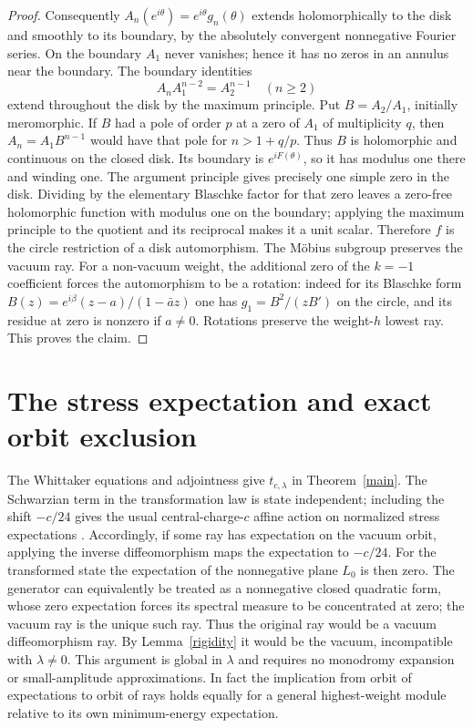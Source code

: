 \documentclass[11pt]{article}
\begin{document}
\begin{proof}
Consequently $A_n(e^{i\theta})=e^{i\theta}g_n(\theta)$ extends holomorphically to the disk and smoothly to its boundary, by the absolutely convergent nonnegative Fourier series. On the boundary $A_1$ never vanishes; hence it has no zeros in an annulus near the boundary. The boundary identities
\[
 A_n A_1^{n-2}=A_2^{n-1}\quad(n\ge2)
\]
extend throughout the disk by the maximum principle. Put $B=A_2/A_1$, initially meromorphic. If $B$ had a pole of order $p$ at a zero of $A_1$ of multiplicity $q$, then $A_n=A_1B^{n-1}$ would have that pole for $n>1+q/p$. Thus $B$ is holomorphic and continuous on the closed disk. Its boundary is $e^{iF(\theta)}$, so it has modulus one there and winding one. The argument principle gives precisely one simple zero in the disk. Dividing by the elementary Blaschke factor for that zero leaves a zero-free holomorphic function with modulus one on the boundary; applying the maximum principle to the quotient and its reciprocal makes it a unit scalar. Therefore $f$ is the circle restriction of a disk automorphism. The Möbius subgroup preserves the vacuum ray. For a non-vacuum weight, the additional zero of the $k=-1$ coefficient forces the automorphism to be a rotation: indeed for its Blaschke form $B(z)=e^{i\beta}(z-a)/(1-\bar a z)$ one has $g_1=B^2/(z B')$ on the circle, and its residue at zero is nonzero if $a\ne0$. Rotations preserve the weight-$h$ lowest ray. This proves the claim.
\end{proof}

\section{The stress expectation and exact orbit exclusion}
The Whittaker equations and adjointness give $t_{c,\lambda}$ in Theorem~\ref{main}. The Schwarzian term in the transformation law is state independent; including the shift $-c/24$ gives the usual central-charge-$c$ affine action on normalized stress expectations \cite{fewster}. Accordingly, if some ray has expectation on the vacuum orbit, applying the inverse diffeomorphism maps the expectation to $-c/24$. For the transformed state the expectation of the nonnegative plane $L_0$ is then zero. The generator can equivalently be treated as a nonnegative closed quadratic form, whose zero expectation forces its spectral measure to be concentrated at zero; the vacuum ray is the unique such ray. Thus the original ray would be a vacuum diffeomorphism ray. By Lemma~\ref{rigidity} it would be the vacuum, incompatible with $\lambda\ne0$. This argument is global in $\lambda$ and requires no monodromy expansion or small-amplitude approximations. In fact the implication from orbit of expectations to orbit of rays holds equally for a general highest-weight module relative to its own minimum-energy expectation.
\end{document}
